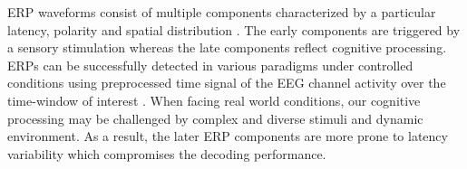 \documentclass[12pt]{iopart}
\begin{document}




ERP waveforms consist of multiple components characterized
by a particular latency, polarity and spatial distribution \cite{duncan_event-related_2009}.
The early components are triggered by a sensory stimulation
whereas the late components reflect cognitive processing.
ERPs can be successfully detected in various paradigms under controlled conditions
using preprocessed time signal of the EEG channel activity over the time-window of interest \cite{blankertz_single-trial_2011}.
When facing real world conditions, our cognitive processing may be challenged
by complex and diverse stimuli and dynamic environment.
As a result, the later ERP components are more prone to latency variability \cite{arico_evaluation_2013}
which compromises the decoding performance.

\end{document}
